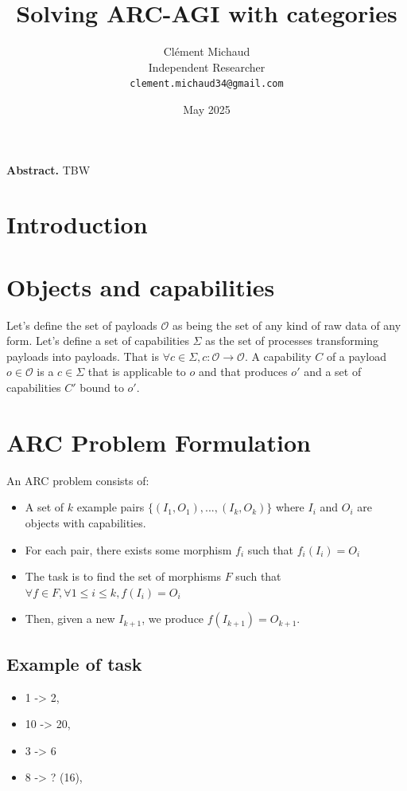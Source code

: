 \documentclass{article}
\title{Solving ARC-AGI with categories}
\author{
Clément Michaud \\
Independent Researcher\\
\texttt{clement.michaud34@gmail.com}
}
\date{May 2025}
\begin{document}
\maketitle

\begin{center}
\begin{minipage}{0.9\textwidth}
\small
\textbf{Abstract.} TBW
\end{minipage}
\end{center}

\vspace{10pt}


\section{Introduction}

\section{Objects and capabilities}

Let's define the set of payloads $\mathcal{O}$ as being the set of any kind of raw data of any form.
Let's define a set of capabilities $\Sigma$ as the set of processes transforming payloads into payloads. That is $\forall c \in \Sigma, c: \mathcal{O} \to \mathcal{O}$.
A capability $C$ of a payload $o \in \mathcal{O}$ is a $c \in \Sigma$ that is applicable to $o$ and that produces $o'$ and a set of capabilities $C'$ bound to $o'$.

\section{ARC Problem Formulation}

An ARC problem consists of:
\begin{itemize}
    \item A set of $k$ example pairs $\{ (I_1, O_1), ..., (I_k, O_k) \}$ where $I_i$ and $O_i$ are objects with capabilities.
    \item For each pair, there exists some morphism $f_i$ such that $f_i(I_i) = O_i$
    \item The task is to find the set of morphisms $F$ such that $\forall f \in F, \forall 1 \leq i \leq k, f(I_i) = O_i$
    \item Then, given a new $I_{k+1}$, we produce $f(I_{k+1})=O_{k+1}$.
\end{itemize}


\subsection{Example of task}
\begin{itemize}
    \item 1 -> 2,
    \item 10 -> 20,
    \item 3 -> 6
    \item 8 -> ? (16),
\end{itemize}
\end{document}
